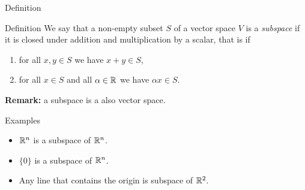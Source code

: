 \documentclass{beamer}
\begin{document}
\begin{frame}[t]{Definition}
	\begin{block}{Definition}
		We say that a non-empty subset $S$ of a vector space $V$ is a \emph{subspace} if it is closed under addition and multiplication by a scalar, that is if
		\begin{enumerate}
			\item for all $x,y \in S$ we have $x + y \in S$,
			\item for all $x \in S$ and all $\alpha \in \mathbb{R}$ we have $\alpha x \in S$.
		\end{enumerate}
	\end{block}
	\vspace{4cm}
	\textbf{Remark:} a subspace is a also vector space.
\end{frame}

\begin{frame}[t]{Examples}
	\begin{itemize}
		\item $\mathbb{R}^n$ is a subspace of $\mathbb{R}^n$.
			\vspace{1.2cm}
		\item $\{ 0 \}$ is a subspace of $\mathbb{R}^n$.
			\vspace{1.2cm}
		\item Any line that contains the origin is subspace of $\mathbb{R}^2$.
	\end{itemize}

\end{frame}


\end{document}
